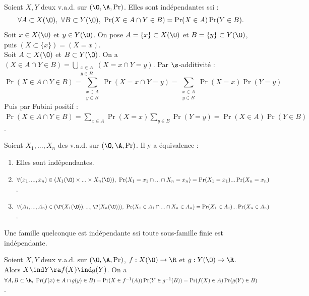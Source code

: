 \documentclass[11pt]{article}
\begin{document}
\begin{thm}{}{}
    Soient $X,Y$ deux v.a.d. sur $(\O,\A,\Pr)$. Elles sont indépendantes ssi :
    \begin{equation*}
        \forall A \subset X(\O), ~ \forall B \subset Y(\O), ~ \Pr(X\in A \cap Y \in B) = \Pr(X\in A)\Pr(Y \in B).
    \end{equation*}
    \tcblower
    \boxed{\la} Soit $x\in X(\O)$ et $y\in Y(\O)$. On pose $A=\{x\}\subset X(\O)$ et $B=\{y\}\subset Y(\O)$, puis $(X \subset \{x\}) = (X=x)$.\\
    \boxed{\ra} Soit $A\subset X(\O)$ et $B\subset Y(\O)$. On a $(X\in A \cap Y \in B) = \bigcup_{\substack{x\in A\\y\in B}}(X=x\cap Y=y)$. Par $\s$-additivité :
    \begin{equation*}
        \Pr(X\in A \cap Y \in B) = \sum_{\substack{x\in A\\y\in B}}\Pr(X=x\cap Y=y)=\sum_{\substack{x\in A\\ y \in B}}\Pr(X=x)\Pr(Y=y)
    \end{equation*}
    Puis par Fubini positif : $\Pr(X\in A \cap Y \in B) = \sum_{x\in A}\Pr(X=x)\sum_{y\in B}\Pr(Y=y) = \Pr(X\in A)\Pr(Y\in B)$.
\end{thm}

\begin{defi}{}{}
    Soient $X_1,...,X_n$ des v.a.d. sur $(\O,\A,\Pr)$. Il y a équivalence :
    \begin{enumerate}
        \item Elles sont indépendantes.
        \item $\forall (x_1,...,x_n) \in (X_1(\O)\times...\times X_n(\O)), ~ \Pr(X_1=x_1 \cap ... \cap X_n=x_n)=\Pr(X_1=x_1)...\Pr(X_n=x_n)$.
        \item $\forall (A_1,...,A_n) \in (\P(X_1(\O)),...,\P(X_n(\O))), ~ \Pr(X_1\in A_1\cap...\cap X_n\in A_n)=\Pr(X_1\in A_1)...\Pr(X_n\in A_n)$.
    \end{enumerate}
    Une famille quelconque est indépendante ssi toute sous-famille finie est indépendante. 
\end{defi}

\begin{prop}{}{}
    Soient $X,Y$ deux v.a.d. sur $(\O,\A,\Pr)$, $f:X(\O)\to\R$ et $g:Y(\O)\to\R$.\\
    Alors $X\ind Y \ra f(X) \ind g(Y)$.
    \tcblower
    On a $\forall A,B \subset \R, ~ \Pr(f(x)\in A \cap g(y)\in B)=\Pr(X\in f^{-1}(A))\Pr(Y\in g^{-1}(B))=\Pr(f(X)\in A)\Pr(g(Y)\in B)$.
\end{prop}
\end{document}
